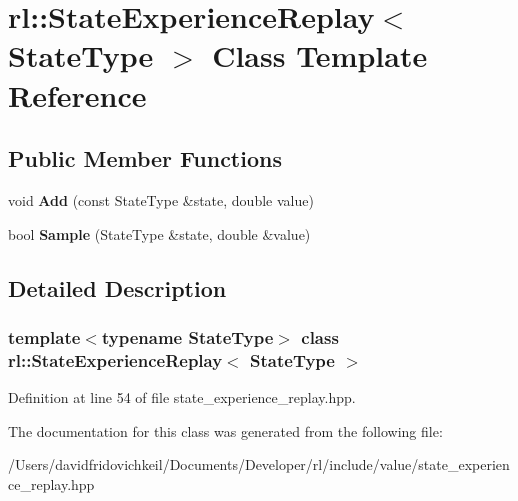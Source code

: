\hypertarget{classrl_1_1_state_experience_replay}{}\section{rl\+:\+:State\+Experience\+Replay$<$ State\+Type $>$ Class Template Reference}
\label{classrl_1_1_state_experience_replay}
\subsection*{Public Member Functions}
\begin{DoxyCompactItemize}
\item 
\hypertarget{classrl_1_1_state_experience_replay_a4ca16567d0f138330bf1d53dc4db62ca}{}\label{classrl_1_1_state_experience_replay_a4ca16567d0f138330bf1d53dc4db62ca} 
void {\bfseries Add} (const State\+Type \&state, double value)
\item 
\hypertarget{classrl_1_1_state_experience_replay_ad73070872353d2bbc9736927ed0589a2}{}\label{classrl_1_1_state_experience_replay_ad73070872353d2bbc9736927ed0589a2} 
bool {\bfseries Sample} (State\+Type \&state, double \&value)
\end{DoxyCompactItemize}


\subsection{Detailed Description}
\subsubsection*{template$<$typename State\+Type$>$\newline
class rl\+::\+State\+Experience\+Replay$<$ State\+Type $>$}



Definition at line 54 of file state\+\_\+experience\+\_\+replay.\+hpp.



The documentation for this class was generated from the following file\+:\begin{DoxyCompactItemize}
\item 
/\+Users/davidfridovichkeil/\+Documents/\+Developer/rl/include/value/state\+\_\+experience\+\_\+replay.\+hpp\end{DoxyCompactItemize}
